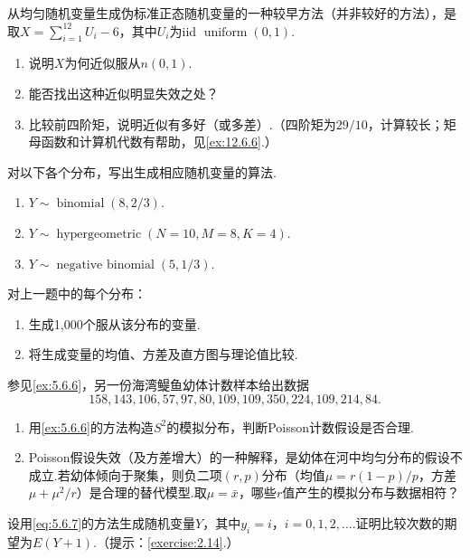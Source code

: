 \begin{exercise}\label{exercise:5.51}
从均匀随机变量生成伪标准正态随机变量的一种较早方法（并非较好的方法），是取$X=\sum_{i=1}^{12}U_i-6$，其中$U_i$为iid $\operatorname{uniform}(0,1)$.
\begin{enumerate}[label=(\alph*)]\item 说明$X$为何近似服从$n(0,1)$.\item 能否找出这种近似明显失效之处？\item 比较前四阶矩，说明近似有多好（或多差）.（四阶矩为$29/10$，计算较长；矩母函数和计算机代数有帮助，见\autoref{ex:12.6.6}.）\end{enumerate}
\end{exercise}
\begin{exercise}\label{exercise:5.52}
对以下各个分布，写出生成相应随机变量的算法.
\begin{enumerate}[label=(\alph*)]\item $Y\sim\operatorname{binomial}(8,2/3)$.\item $Y\sim\operatorname{hypergeometric}(N=10,M=8,K=4)$.\item $Y\sim\operatorname{negative\ binomial}(5,1/3)$.\end{enumerate}
\end{exercise}
\begin{exercise}\label{exercise:5.53}
对上一题中的每个分布：
\begin{enumerate}[label=(\alph*)]\item 生成1,000个服从该分布的变量.\item 将生成变量的均值、方差及直方图与理论值比较.\end{enumerate}
\end{exercise}
\begin{exercise}\label{exercise:5.54}
参见\autoref{ex:5.6.6}，另一份海湾{\upshape{}鳀}鱼幼体计数样本给出数据
$$158,143,106,57,97,80,109,109,350,224,109,214,84.$$
\begin{enumerate}[label=(\alph*)]
\item 用\autoref{ex:5.6.6}的方法构造$S^2$的模拟分布，判断Poisson计数假设是否合理.
\item Poisson假设失效（及方差增大）的一种解释，是幼体在河中均匀分布的假设不成立.若幼体倾向于聚集，则负二项$(r,p)$分布（均值$\mu=r(1-p)/p$，方差$\mu+\mu^2/r$）是合理的替代模型.取$\mu=\bar x$，哪些$r$值产生的模拟分布与数据相符？
\end{enumerate}
\end{exercise}
\begin{exercise}\label{exercise:5.55}
设用\eqref{eq:5.6.7}的方法生成随机变量$Y$，其中$y_i=i$，$i=0,1,2,\ldots$.证明比较次数的期望为$E(Y+1)$.（提示：\autoref{exercise:2.14}.）
\end{exercise}
